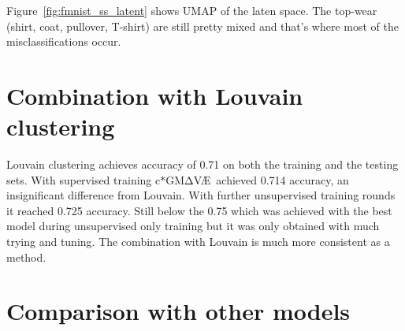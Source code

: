 \documentclass[11pt, a4paper]{report}
\theoremstyle{plain}
\theoremstyle{definition}
\theoremstyle{remark}
\newcommand{\gmvae}{c$\ast$GM$\mathrm{\Delta}$V\AE~}
\begin{document}
Figure~\ref{fig:fmnist_ss_latent} shows UMAP of the laten space.
The top-wear (shirt, coat, pullover, T-shirt) are still pretty mixed and that's
where most of the misclassifications occur.


\section{Combination with Louvain clustering}

Louvain clustering achieves accuracy of 0.71 on both the training and the
testing sets.
With supervised training \gmvae achieved 0.714 accuracy, an insignificant
difference from Louvain. With further unsupervised training rounds it reached 
0.725 accuracy. Still below the 0.75 which was achieved with the best model during 
unsupervised only training but it was only obtained
with much trying and tuning.
The combination with Louvain is much more consistent as a method.


\section{Comparison with other models}
\end{document}
